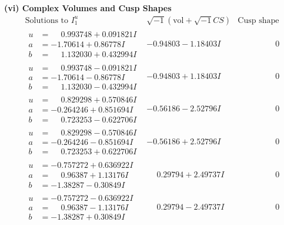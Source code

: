 \documentclass[1p]{elsarticle_modified}
\theoremstyle{definition}
\newcommand{\I}{\sqrt{-1}}
\begin{document}
\newpage\flushleft \textbf{(vi) Complex Volumes and Cusp Shapes}
$$\begin{array}{c|c|c}  
\text{Solutions to }I^u_{1}& \I (\text{vol} + \sqrt{-1}CS) & \text{Cusp shape}\\
 \hline 
\begin{aligned}
u &= \phantom{-}0.993748 + 0.091821 I \\
a &= -1.70614 + 0.86778 I \\
b &= \phantom{-}1.132030 + 0.432994 I\end{aligned}
 & -0.94803 - 1.18403 I & \phantom{-0.000000 } 0 \\ \hline\begin{aligned}
u &= \phantom{-}0.993748 - 0.091821 I \\
a &= -1.70614 - 0.86778 I \\
b &= \phantom{-}1.132030 - 0.432994 I\end{aligned}
 & -0.94803 + 1.18403 I & \phantom{-0.000000 } 0 \\ \hline\begin{aligned}
u &= \phantom{-}0.829298 + 0.570846 I \\
a &= -0.264246 + 0.851694 I \\
b &= \phantom{-}0.723253 - 0.622706 I\end{aligned}
 & -0.56186 - 2.52796 I & \phantom{-0.000000 } 0 \\ \hline\begin{aligned}
u &= \phantom{-}0.829298 - 0.570846 I \\
a &= -0.264246 - 0.851694 I \\
b &= \phantom{-}0.723253 + 0.622706 I\end{aligned}
 & -0.56186 + 2.52796 I & \phantom{-0.000000 } 0 \\ \hline\begin{aligned}
u &= -0.757272 + 0.636922 I \\
a &= \phantom{-}0.96387 + 1.13176 I \\
b &= -1.38287 - 0.30849 I\end{aligned}
 & \phantom{-}0.29794 + 2.49737 I & \phantom{-0.000000 } 0 \\ \hline\begin{aligned}
u &= -0.757272 - 0.636922 I \\
a &= \phantom{-}0.96387 - 1.13176 I \\
b &= -1.38287 + 0.30849 I\end{aligned}
 & \phantom{-}0.29794 - 2.49737 I & \phantom{-0.000000 } 0 \\ \hline\begin{aligned}

\end{aligned}
\end{array}$$
\end{document}
